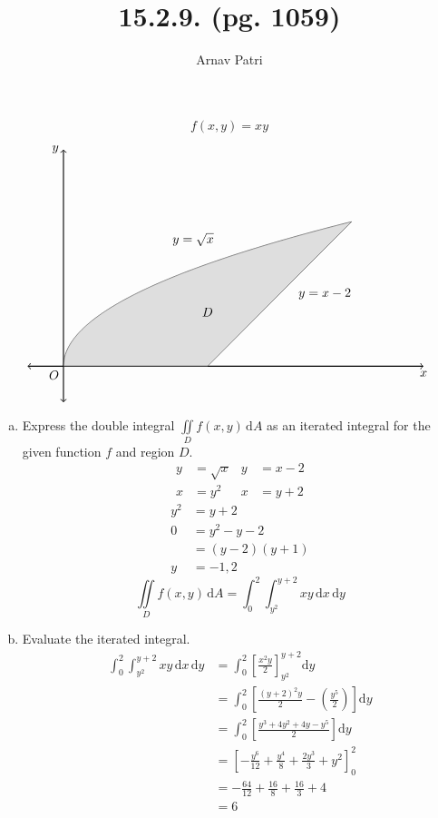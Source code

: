 \documentclass[12pt]{article}
\title{15.2.9. (pg. 1059)}
\author{Arnav Patri}
\renewcommand{\d}{\text{d}}
\begin{document}
	\maketitle
	\thispagestyle{empty}
		\[f(x, y) = xy\]
		\[\begin{tikzpicture}[scale = 2]
			\draw[<->, thick] (-0.5, 0) -- (5, 0) node[below]{$x$};
			\draw[<->, thick] (0, -0.5) -- (0, 3) node[left]{$y$};
			\node[anchor = north east] at (0, 0) {$O$};
			\draw[domain = 0:4, smooth, samples = 300, variable = \x] plot({\x}, {sqrt(\x)});
				\node[above] at (1.8, 1.6) {$y = \sqrt{x}$};
			\draw[] (2, 0) -- (4, 2);
				\node[right] at (3.2, 1) {$y = x - 2$};
			\fill[lightgray, opacity = 0.5, domain = 0:4, smooth, samples = 300, variable = \x] (0, 0) -- plot({\x}, {sqrt(\x)}) -- (2, 0);
			\node at (2, 0.75) {$D$};
		\end{tikzpicture}\]
	\begin{enumerate}[(a)]
		\item 
			Express the double integral $\iint\limits_D f(x, y)\,\d A$ as an iterated integral for the given function $f$ and region $D$. 
			\begin{align*}
				y &= \sqrt{x} &
						y &= x - 2 \\
				x &= y^2 &
						x &= y + 2
			\end{align*}
			\begin{align*}
				y^2 &= y + 2 \\
				0 &= y^2 - y - 2 \\
					&= (y - 2)(y + 1) \\
				y &= -1, 2	
			\end{align*}
			\[\iint\limits_D f(x, y)\,\d A = \int_0^2\int_{y^2}^{y + 2} xy\,\d x\,\d y\]
		\item
			Evaluate the iterated integral.
			\begin{align*}
				\int_0^2\int_{y^2}^{y + 2} xy\,\d x\,\d y &= \int_0^2\left[\frac{x^2y}{2}\right]_{y^2}^{y + 2}\d y \\
					&= \int_0^2\left[\frac{(y + 2)^2y}{2} - \left(\frac{y^5}{2}\right)\right]\d y \\
					&= \int_0^2\left[\frac{y^3 + 4y^2 + 4y - y^5}{2}\right]\d y \\
					&= \left[-\frac{y^6}{12} + \frac{y^4}{8} + \frac{2y^3}{3} + y^2\right]_0^2 \\
					&= -\frac{64}{12} + \frac{16}{8} + \frac{16}{3} + 4 \\
					&= 6
			\end{align*}
	\end{enumerate}
\end{document}
